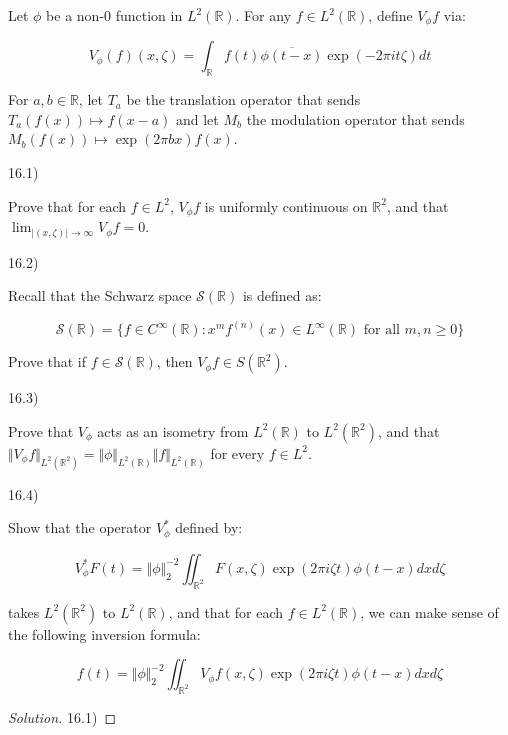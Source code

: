 \documentclass[10pt]{article}
\newenvironment{problem}[2][]{\begin{trivlist}
\item[\hskip \labelsep {\bfseries #1}\hskip \labelsep {\bfseries #2.}]}{\end{trivlist}}
\begin{document}
\begin{problem}{Question 16}

Let $\phi$ be a non-0 function in $L^2(\mathbb{R})$. For any $f \in L^2(\mathbb{R})$, define $V_\phi f$ via:

$$ V_\phi(f)(x, \zeta) = \int_{\mathbb{R}} f(t) \overline{\phi(t-x)} \exp(-2 \pi i t \zeta) dt $$

For $a, b \in \mathbb{R}$, let $T_a$ be the translation operator that sends $T_a(f(x)) \mapsto f(x -a )$ and let $M_b$ the modulation operator that sends $M_b(f(x)) \mapsto \exp(2 \pi bx)f(x)$.

16.1)

Prove that for each $f\in L^2$, $V_\phi f$ is uniformly continuous on $\mathbb{R}^2$, and that $\lim_{|(x, \zeta)| \to \infty} V_\phi f = 0$.

16.2)

Recall that the Schwarz space $\mathcal{S}(\mathbb{R})$ is defined as:

$$ \mathcal{S}(\mathbb{R}) = \{ f \in C^\infty(\mathbb{R}) : x^m f^{(n)}(x) \in L^\infty(\mathbb{R}) \text{ for all } m, n \geq 0 \}$$

Prove that if $f \in \mathcal{S}(\mathbb{R})$, then $V_\phi f \in S(\mathbb{R}^2)$.

16.3)

Prove that $V_\phi$ acts as an isometry from $L^2(\mathbb{R})$ to $L^2(\mathbb{R}^2)$, and that $\Vert V_\phi f \Vert_{L^2(\mathbb{R}^2)} = \Vert \phi \Vert_{L^2(\mathbb{R})} \Vert f \Vert_{L^2(\mathbb{R})}$ for every $f \in L^2$.

16.4)

Show that the operator $V_\phi^*$ defined by:

$$ V_\phi^* F(t) = \Vert \phi\Vert_2^{-2} \iint_{\mathbb{R}^2} F(x, \zeta) \exp(2\pi i \zeta t) \phi(t - x) dx d\zeta $$

takes $L^2(\mathbb{R}^2)$ to $L^2(\mathbb{R})$, and that for each $f \in L^2(\mathbb{R})$, we can make sense of the following inversion formula:

$$ f(t) = \Vert \phi \Vert_2^{-2} \iint_{\mathbb{R}^2} V_\phi f(x, \zeta) \exp(2 \pi i \zeta t) \phi(t - x) dx d\zeta $$

\end{problem}

\begin{proof}[Solution]

16.1)


\end{proof}
\end{document}
